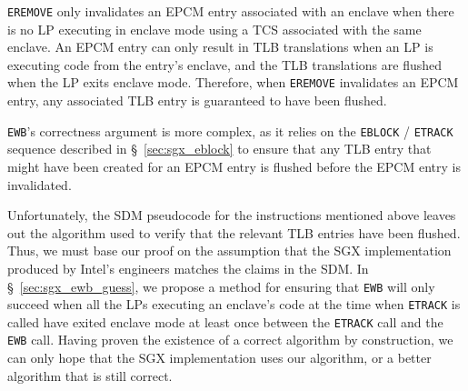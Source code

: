 \texttt{EREMOVE} only invalidates an EPCM entry associated with an enclave when
there is no LP executing in enclave mode using a TCS associated with the same
enclave. An EPCM entry can only result in TLB translations when an LP is
executing code from the entry's enclave, and the TLB translations are flushed
when the LP exits enclave mode. Therefore, when \texttt{EREMOVE} invalidates
an EPCM entry, any associated TLB entry is guaranteed to have been flushed.

\texttt{EWB}'s correctness argument is more complex, as it relies on the
\texttt{EBLOCK} / \texttt{ETRACK} sequence described in \S~\ref{sec:sgx_eblock}
to ensure that any TLB entry that might have been created for an EPCM entry is
flushed before the EPCM entry is invalidated.

Unfortunately, the SDM pseudocode for the instructions mentioned above leaves
out the algorithm used to verify that the relevant TLB entries have been
flushed. Thus, we must base our proof on the assumption that the SGX
implementation produced by Intel's engineers matches the claims in the SDM.
In \S~\ref{sec:sgx_ewb_guess}, we propose a method for ensuring that
\texttt{EWB} will only succeed when all the LPs executing an enclave's code at
the time when \texttt{ETRACK} is called have exited enclave mode at least once
between the \texttt{ETRACK} call and the \texttt{EWB} call. Having proven the
existence of a correct algorithm by construction, we can only hope that the SGX
implementation uses our algorithm, or a better algorithm that is still correct.

